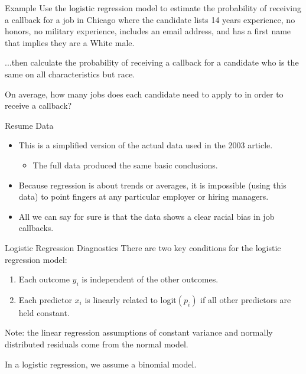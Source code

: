 \begin{frame}{Example}
    Use the logistic regression model to estimate the probability of receiving a callback for a job in Chicago where the candidate lists 14 years experience, no honors, no military experience, includes an email address, and has a first name that implies they are a White male.
    
    \vspace{12pt}...then calculate the probability of receiving a callback for a candidate who is the same on all characteristics but race.
    
    \vspace{18pt}On average, how many jobs does each candidate need to apply to in order to receive a callback?
\end{frame}

\begin{frame}{Resume Data}
    \begin{itemize}
        \item This is a simplified version of the actual data used in the 2003 article.
        \begin{itemize}
            \item The full data produced the same basic conclusions.
        \end{itemize}
        \item Because regression is about trends or averages, it is impossible (using this data) to point fingers at any particular employer or hiring managers.
        \item All we can say for sure is that the data shows a clear racial bias in job callbacks. 
    \end{itemize}
\end{frame}

\begin{frame}{Logistic Regression Diagnostics}
    There are two key conditions for the logistic regression model:
    \begin{enumerate}
        \item Each outcome $y_i$ is independent of the other outcomes.
        \item Each predictor $x_i$ is linearly related to logit$(p_i)$ if all other predictors are held constant.
    \end{enumerate}
    
    \vspace{12pt}Note: the linear regression assumptions of constant variance and normally distributed residuals come from the normal model.
    
    \vspace{12pt}In a logistic regression, we assume a binomial model. 
\end{frame}

